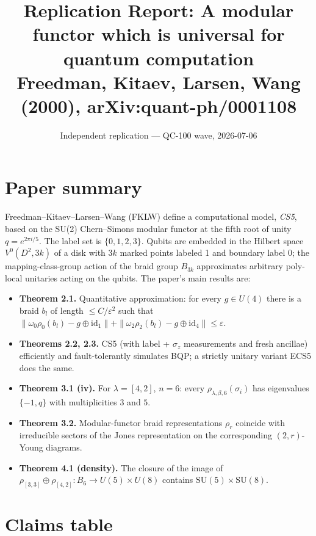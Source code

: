 \documentclass[11pt]{article}
\title{Replication Report: A modular functor which is universal for quantum computation \\
{\large\normalfont Freedman, Kitaev, Larsen, Wang (2000), arXiv:quant-ph/0001108}}
\author{Independent replication --- QC-100 wave, 2026-07-06}
\date{}
\newcommand{\FKW}{FKLW}
\newcommand{\qexp}{q = e^{2\pi i / 5}}
\begin{document}
\maketitle

\section{Paper summary}

Freedman--Kitaev--Larsen--Wang (\FKW) define a computational model, \emph{CS5}, based on the SU(2) Chern--Simons modular functor at the fifth root of unity $\qexp$. The label set is $\{0,1,2,3\}$. Qubits are embedded in the Hilbert space $V^0(D^2, 3k)$ of a disk with $3k$ marked points labeled 1 and boundary label 0; the mapping-class-group action of the braid group $B_{3k}$ approximates arbitrary poly-local unitaries acting on the qubits. The paper's main results are:

\begin{itemize}
  \item \textbf{Theorem 2.1.} Quantitative approximation: for every $g \in U(4)$ there is a braid $b_l$ of length $\le C/\varepsilon^2$ such that $\|\omega_0 \rho_0(b_l) - g \oplus \mathrm{id}_1\| + \|\omega_2 \rho_2(b_l) - g \oplus \mathrm{id}_4\| \le \varepsilon$.
  \item \textbf{Theorems 2.2, 2.3.} CS5 (with label + $\sigma_z$ measurements and fresh ancillae) efficiently and fault-tolerantly simulates BQP; a strictly unitary variant ECS5 does the same.
  \item \textbf{Theorem 3.1 (iv).} For $\lambda = [4,2]$, $n = 6$: every $\rho_{\lambda,\beta,6}(\sigma_i)$ has eigenvalues $\{-1, q\}$ with multiplicities $3$ and $5$.
  \item \textbf{Theorem 3.2.} Modular-functor braid representations $\rho_r$ coincide with irreducible sectors of the Jones representation on the corresponding $(2,r)$-Young diagrams.
  \item \textbf{Theorem 4.1 (density).} The closure of the image of $\rho_{[3,3]} \oplus \rho_{[4,2]}: B_6 \to U(5) \times U(8)$ contains $\mathrm{SU}(5) \times \mathrm{SU}(8)$.
\end{itemize}

\section{Claims table}
\end{document}
